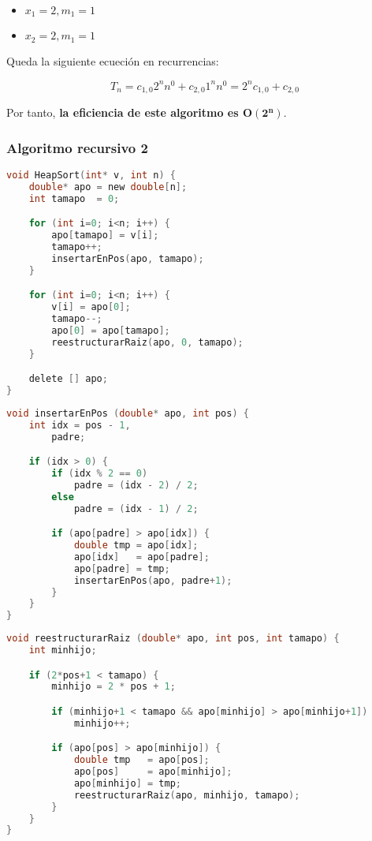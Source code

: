 \begin{itemize}
	\item $x_1=2, m_1=1$
	\item $x_2=2, m_1=1$
\end{itemize}

Queda la siguiente ecueción en recurrencias:

\[T_n=c_{1,0}2^n n^0+c_{2,0}1^n n^0=2^n c_{1,0}+c_{2,0}\]

Por tanto, \textbf{la eficiencia de este algoritmo es $\boldsymbol{O(2^n)}$}.

\pagebreak

\subsubsection{Algoritmo recursivo 2}

\begin{lstlisting}[language=C]
void HeapSort(int* v, int n) {
	double* apo = new double[n];
	int tamapo  = 0;

	for (int i=0; i<n; i++) {
		apo[tamapo] = v[i];
		tamapo++;
		insertarEnPos(apo, tamapo);
	}

	for (int i=0; i<n; i++) {
		v[i] = apo[0];
		tamapo--;
		apo[0] = apo[tamapo];
		reestructurarRaiz(apo, 0, tamapo);
	}

	delete [] apo;
}
\end{lstlisting}

\begin{lstlisting}[language=C]
void insertarEnPos (double* apo, int pos) {
	int idx = pos - 1,
	    padre;

	if (idx > 0) {
		if (idx % 2 == 0)
			padre = (idx - 2) / 2;
		else
			padre = (idx - 1) / 2;

		if (apo[padre] > apo[idx]) {
			double tmp = apo[idx];
			apo[idx]   = apo[padre];
			apo[padre] = tmp;
			insertarEnPos(apo, padre+1);
		}
	}
}
\end{lstlisting}

\begin{lstlisting}[language=C]
void reestructurarRaiz (double* apo, int pos, int tamapo) {
	int minhijo;

	if (2*pos+1 < tamapo) {
		minhijo = 2 * pos + 1;

		if (minhijo+1 < tamapo && apo[minhijo] > apo[minhijo+1])
			minhijo++;

		if (apo[pos] > apo[minhijo]) {
			double tmp   = apo[pos];
			apo[pos]     = apo[minhijo];
			apo[minhijo] = tmp;
			reestructurarRaiz(apo, minhijo, tamapo);
		}
	}
}
\end{lstlisting}

